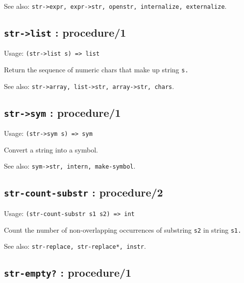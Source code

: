 \documentclass[
]{article}
\newcommand{\passthrough}[1]{#1}
\begin{document}
See also:
\passthrough{\lstinline!str->expr, expr->str, openstr, internalize, externalize!}.

\hypertarget{str-list-procedure1-1}{%
\subsection{\texorpdfstring{\texttt{str-\textgreater{}list} :
procedure/1}{str-\textgreater list : procedure/1}}\label{str-list-procedure1-1}}

Usage: \passthrough{\lstinline!(str->list s) => list!}

Return the sequence of numeric chars that make up string
\passthrough{\lstinline!s.!}

See also:
\passthrough{\lstinline!str->array, list->str, array->str, chars!}.

\hypertarget{str-sym-procedure1-1}{%
\subsection{\texorpdfstring{\texttt{str-\textgreater{}sym} :
procedure/1}{str-\textgreater sym : procedure/1}}\label{str-sym-procedure1-1}}

Usage: \passthrough{\lstinline!(str->sym s) => sym!}

Convert a string into a symbol.

See also: \passthrough{\lstinline!sym->str, intern, make-symbol!}.

\hypertarget{str-count-substr-procedure2-1}{%
\subsection{\texorpdfstring{\texttt{str-count-substr} :
procedure/2}{str-count-substr : procedure/2}}\label{str-count-substr-procedure2-1}}

Usage: \passthrough{\lstinline!(str-count-substr s1 s2) => int!}

Count the number of non-overlapping occurrences of substring
\passthrough{\lstinline!s2!} in string \passthrough{\lstinline!s1.!}

See also: \passthrough{\lstinline!str-replace, str-replace*, instr!}.

\hypertarget{str-empty-procedure1-1}{%
\subsection{\texorpdfstring{\texttt{str-empty?} :
procedure/1}{str-empty? : procedure/1}}\label{str-empty-procedure1-1}}
\end{document}
